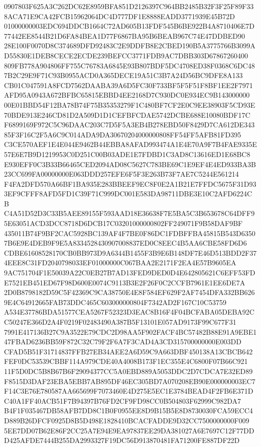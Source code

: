 \documentclass[UTF8,fontset=fandol,zihao=-4,a4paper]{ctexart}
\begin{document}
{{0907803F625A3C262DC62E8959BFA851D2126397C964BB2485B32F3F25F89F338ACA71E9CA42FCB15962064DC4D777DF1E8888EADD3771939E45B72D
01000000003EDC694DDCB1664C72AD605B13FDF545B6BE922B4A8710406E7D77442EE8544B21D6FA84BEA1D77F6867BA95B6BEAB967C74E47DDBED90
28E100F0070D8C374689DFD92483C2E9DDFB8E2CBED190B5A3775766B3099AD55830E1DEB8CECE2ECDE239BEFCC3771FDB9AC7DBB303D67867260400
809FB778A904806FF755C76783A6845E93B807BDF5DC4708ED38F0368C6DC487B2C29E9F71C93B0955ACD0A365DECE19A51C3B7A24D56BC9DFE8A133
CB01C047591A8FCD7562DAABA39A6D5FC30F733BF5F5F51F8BF1EE2F7971AFD95A0943A672BFBC65815EBBD4EE2168D7C930DC0E934EC9B143000000
00E01BBD54F12BA78B74F75B35353279F1C480BF7CF2E0C9EE38903F5CD93E70BDE913E246CD81D2A509D1D1CEFBFCDAE5742DCBE688E10080BDF17C
F6899169F972C5C96DAAC203C7D5F5A3EB4B278EBD50F8429D7CA612DE34385F3F16C2F5A6C9C014ADA9DA30670204000000808FF54FF5AFB81FD395
C3CE570AEF1E4E044E9462B44EBBA8AFAD993474A1E4E70A9F7B4FAE9335E57E6E7B9D1219953C0D251C00B03ADE1E7FDBD1C3AD8C13616ED1E68BC8
E930EFF0C3B33B66465CED2094AD08C5627C783BE69C1E9EF4E4ED933BA3B23CC699FA00000000E063DDD257EFE6F5F3E263B73F7AE7C5244E561214
F4FA2DFD570A66BF1BA935E283BBEEF9EC8F0E2A1B21E7FFDC5675F31D933EF9CFFF8AFD5FD1C39F71C999DC001E583DA98711DBE3E10C2AFD6224CB
C4A51D52D3C33B5AEE89155F593AAD18E36638F7E5BA5C3B653678C64DFF95E63051ACD3DCC8718D6DCB17C03201000000802FF249071F9B58DAF9BF
435011B74F9BF2CAC5928BC139AF4F7BE0F86DC1FDBFFBA45815B543D63507B6E9E4DEB9F9E5A8334528430907008837ED0C8EEC4B5AA6CBE58FD6D6
CDBE61608528170CB0BB973D9A6344B1455F3B9E6B148DF7E46D513BDD2F374EEE8C31FD2040798033EF01000000C067BAA2E2171F2EA4E57B9605EA
9AC751704F1E50039A22C0EB27B7AD13FED9DED0D4E642805621C6EFF53FDE7521EB451ED67F98D600E0074C9113B3E2F26F0C2CCFB7961E1EE6DE7A
2D0B8798182D59C5F42369C9CA38750E4E8F584EF629F2AF7454DFA332BB6269E4C64912665FAB73DDC465C603000000804F7342AD2F167C10C53759
A534E37786BDA51577CEA5267F52323D3EAC8B16F4F04BCFABA05DEBA92CC50247E366D2A4F0219F02483490A387B5F13101E057AD9173F99C677F31
7991E417136B27C9A3522E79CDC2D98AA5F902FACF4BC57482B88E91A9EBE147FBAD6236BB59F872C32C79F2F6A7F3CAD4A3CD315700000000E003DD
CFAD5B51F31714837FFB27EB34AEE2A6D59C9A663DBF450138A13CBCB642FEF0DC53539CBBF114A979CDE40A4008B173F1EC355E4C6800F07B66C921
11F5D0DC5B8B67B6F29094377CC5A0EBD889A5053DDC2D7CDCA7E32ED89F8515D3DAF23EBA5EBB7AB895DF46EC305BD7A070208EB90E000000003EC7
F14C3E76E780587AA665699F7073460E4D275E5EC1E3784BEAD4F2FB6E371DC40A1FF40ACB51F7B94397B76FD2CF9FD98CC0B504803F62999C982DA7
B4F1F035467DB58AFB7DD8C1B0F0955EE8D9B15B5E8D8730030FCA59ECC4D889B26DFCF0925D8B5D498E1828410BCACFADDE9D32CC7500000000F009
5EE7DD07B62E86F2CC25A7E94E9EA97837EE29DA381027A6E7697C12F77DDD425AFDE7444B255DA2993327F19DC56D913870481FA71200FE887DF22D
}}
\end{document}
